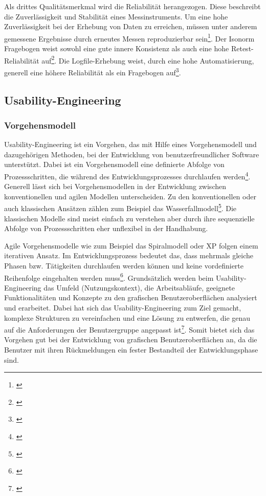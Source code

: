 Als drittes Qualitätsmerkmal wird die Reliabilität herangezogen. Diese beschreibt die Zuverlässigkeit und Stabilität eines Messinstruments. Um eine hohe Zuverlässigkeit bei der Erhebung von Daten zu erreichen, müssen unter anderem gemessene Ergebnisse durch erneutes Messen reproduzierbar sein\footnote{\cite[vgl.][Kap. 1]{Himme2007}}. Der Isonorm Fragebogen weist sowohl eine gute innere Konsistenz als auch eine hohe Retest-Reliabilität auf\footnote{\cite[vgl.][Kap. 3.5.3]{Figl2010}}. Die Logfile-Erhebung weist, durch eine hohe Automatisierung, generell eine höhere Reliabilität als ein Fragebogen auf\footnote{\cite[vgl.][Kap. 65.3]{Baur2014}}.


\subsection{Usability-Engineering}
\subsubsection{Vorgehensmodell}
\label{sec:vorgehensmodellUsabilityEngineering}
Usability-Engineering ist ein Vorgehen, das mit Hilfe eines Vorgehensmodell und dazugehörigen Methoden, bei der Entwicklung von benutzerfreundlicher Software unterstützt. Dabei ist ein Vorgehensmodell eine definierte Abfolge von Prozessschritten, die während des Entwicklungsprozesses durchlaufen werden\footnote{\cite[vgl.][7]{Richter2013}}. Generell lässt sich bei Vorgehensmodellen in der Entwicklung zwischen konventionellen und agilen Modellen unterscheiden. Zu den konventionellen oder auch klassischen Ansätzen zählen zum Beispiel das Wasserfallmodell\footnote{\cite[vgl.][27\psqq]{Brandt2008}}. Die klassischen Modelle sind meist einfach zu verstehen aber durch ihre sequenzielle Abfolge von Prozessschritten eher unflexibel in der Handhabung.

Agile Vorgehensmodelle wie zum Beispiel das Spiralmodell oder \gls{XP} folgen einem iterativen Ansatz. Im Entwicklungsprozess bedeutet das, dass mehrmals gleiche Phasen bzw. Tätigkeiten durchlaufen werden können und keine vordefinierte Reihenfolge eingehalten werden muss\footnote{\cite[vgl.][29\psqq]{Brandt2008}}. Grundsätzlich werden beim Usability-Engineering das Umfeld (Nutzungskontext), die Arbeitsabläufe, geeignete Funktionalitäten und Konzepte zu den grafischen Benutzeroberflächen analysiert und erarbeitet. Dabei hat sich das Usability-Engineering zum Ziel gemacht, komplexe Strukturen zu vereinfachen und eine Lösung zu entwerfen, die genau auf die Anforderungen der Benutzergruppe angepasst ist\footnote{\cite[vgl.][7]{Richter2013}}. Somit bietet sich das Vorgehen gut bei der Entwicklung von grafischen Benutzeroberflächen an, da die Benutzer mit ihren Rückmeldungen ein fester Bestandteil der Entwicklungsphase sind.

